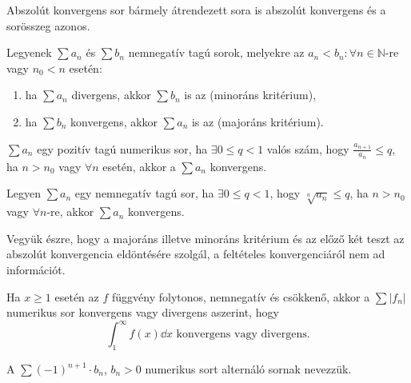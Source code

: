 \begin{theorem}
  Abszolút konvergens sor bármely átrendezett sora is abszolút konvergens és a
  sorösszeg azonos.
\end{theorem}

\begin{theorem}
  Legyenek $\sum a_n$ és $\sum b_n$ nemnegatív tagú sorok, melyekre az $a_n <
    b_n : \forall n \in \mathbb{N}$-re vagy $n_0 < n$ esetén:
  \begin{enumerate}
    \item ha $\sum a_n$ divergens, akkor $\sum b_n$ is az (minoráns kritérium),
    \item ha $\sum b_n$ konvergens, akkor $\sum a_n$ is az (majoráns kritérium).
  \end{enumerate}
\end{theorem}

\begin{theorem}
  $\sum a_n$ egy pozitív tagú numerikus sor, ha $\exists 0 \leq q < 1$ valós
  szám, hogy $\frac{a_{n+1}}{a_n} \leq q$, ha $n>n_0$ vagy $\forall n$ esetén,
  akkor a $\sum a_n$ konvergens. %
\end{theorem}

\begin{theorem}
  Legyen $\sum a_n$ egy nemnegatív tagú sor, ha $\exists 0 \leq q < 1$,
  hogy $\sqrt[n]{a_n} \leq q$, ha $n>n_0$ vagy $\forall n$-re, akkor
  $\sum a_n$ konvergens.
\end{theorem}

\begin{note}
  Vegyük észre, hogy a majoráns illetve minoráns kritérium és az előző két
  teszt az abszolút konvergencia eldöntésére szolgál, a feltételes
  konvergenciáról nem ad információt.
\end{note}

\begin{theorem}
  Ha $x \geq 1$ esetén az $f$ függvény folytonos, nemnegatív és csökkenő, akkor
  a $\sum |f_n|$ numerikus sor konvergens vagy divergens aszerint, hogy
  \[
    \int_1^\infty f(x) \dd x
    \text{ konvergens vagy divergens.}
  \]
\end{theorem}

\begin{definition}
  A $\sum (-1)^{n+1} \cdot b_n$, $b_n > 0$ numerikus sort alternáló sornak
  nevezzük.
\end{definition}

